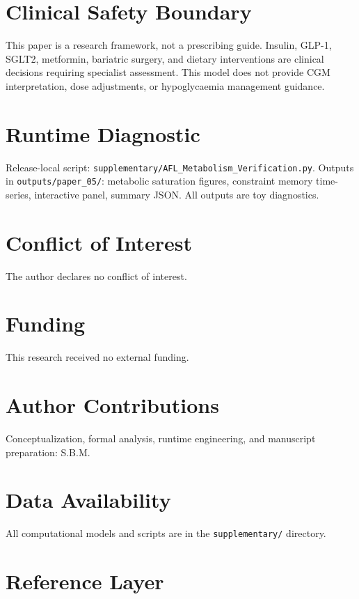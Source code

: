 \documentclass[11pt]{article}
\begin{document}
\section{Clinical Safety Boundary}

This paper is a research framework, not a prescribing guide. Insulin, GLP-1, SGLT2, metformin, bariatric surgery, and dietary interventions are clinical decisions requiring specialist assessment. This model does not provide CGM interpretation, dose adjustments, or hypoglycaemia management guidance.

\section{Runtime Diagnostic}

Release-local script: \texttt{supplementary/AFL\_Metabolism\_Verification.py}. Outputs in \texttt{outputs/paper\_05/}: metabolic saturation figures, constraint memory time-series, interactive panel, summary JSON. All outputs are toy diagnostics.

\section*{Conflict of Interest} The author declares no conflict of interest.
\section*{Funding} This research received no external funding.
\section*{Author Contributions} Conceptualization, formal analysis, runtime engineering, and manuscript preparation: S.B.M.
\section*{Data Availability} All computational models and scripts are in the \texttt{supplementary/} directory.

\section{Reference Layer}


\end{document}
